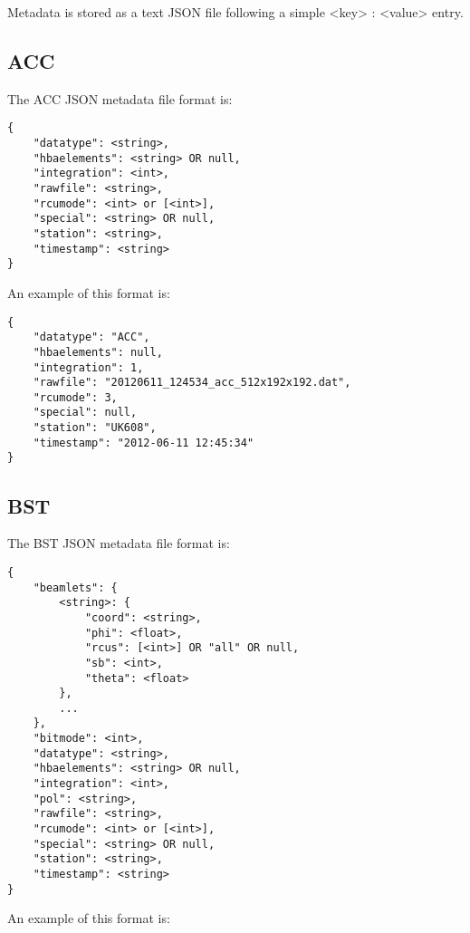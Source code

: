 \documentclass[10pt,a4paper]{article}
\begin{document}
Metadata is stored as a text JSON file following a simple <key> : <value> entry.

\subsection{ACC}

The ACC JSON metadata file format is:

\begin{verbatim}
{
    "datatype": <string>,
    "hbaelements": <string> OR null,
    "integration": <int>,
    "rawfile": <string>,
    "rcumode": <int> or [<int>],
    "special": <string> OR null,
    "station": <string>,
    "timestamp": <string>
}
\end{verbatim}

\noindent An example of this format is:

\begin{verbatim}
{
    "datatype": "ACC",
    "hbaelements": null,
    "integration": 1,
    "rawfile": "20120611_124534_acc_512x192x192.dat",
    "rcumode": 3,
    "special": null,
    "station": "UK608",
    "timestamp": "2012-06-11 12:45:34"
}
\end{verbatim}

\subsection{BST}

The BST JSON metadata file format is:

\begin{verbatim}
{
    "beamlets": {
        <string>: {
            "coord": <string>,
            "phi": <float>,
            "rcus": [<int>] OR "all" OR null,
            "sb": <int>,
            "theta": <float>
        },
		...
    },
    "bitmode": <int>,
    "datatype": <string>,
    "hbaelements": <string> OR null,
    "integration": <int>,
    "pol": <string>,
    "rawfile": <string>,
    "rcumode": <int> or [<int>],
    "special": <string> OR null,
    "station": <string>,
    "timestamp": <string>
}
\end{verbatim}

\noindent An example of this format is:
\end{document}
